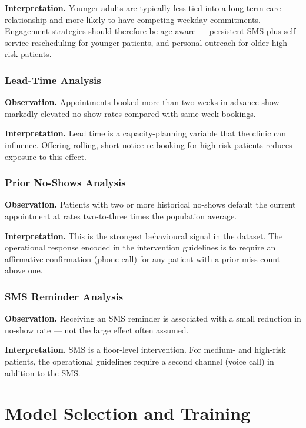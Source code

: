 \documentclass[11pt,a4paper]{article}
\begin{document}
\textbf{Interpretation.} Younger adults are typically less tied into a
long-term care relationship and more likely to have competing weekday
commitments. Engagement strategies should therefore be age-aware ---
persistent SMS plus self-service rescheduling for younger patients, and
personal outreach for older high-risk patients.

\subsubsection{Lead-Time Analysis}
\textbf{Observation.} Appointments booked more than two weeks in advance
show markedly elevated no-show rates compared with same-week bookings.

\textbf{Interpretation.} Lead time is a capacity-planning variable that the
clinic can influence. Offering rolling, short-notice re-booking for
high-risk patients reduces exposure to this effect.

\subsubsection{Prior No-Shows Analysis}
\textbf{Observation.} Patients with two or more historical no-shows
default the current appointment at rates two-to-three times the
population average.

\textbf{Interpretation.} This is the strongest behavioural signal in the
dataset. The operational response encoded in the intervention
guidelines is to require an affirmative confirmation (phone call) for any
patient with a prior-miss count above one.

\subsubsection{SMS Reminder Analysis}
\textbf{Observation.} Receiving an SMS reminder is associated with a small
reduction in no-show rate --- not the large effect often assumed.

\textbf{Interpretation.} SMS is a floor-level intervention. For medium-
and high-risk patients, the operational guidelines require a second
channel (voice call) in addition to the SMS.

\section{Model Selection and Training}
\end{document}
